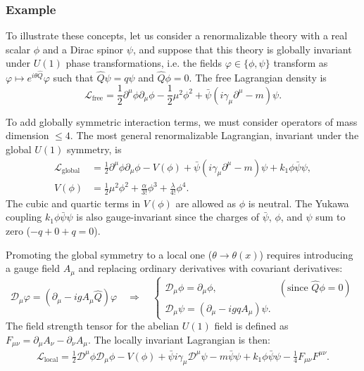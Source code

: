 \subsubsection{Example}
To illustrate these concepts, let us consider a renormalizable theory with a real scalar $\phi$ and a Dirac spinor $\psi$, and suppose that this theory is globally invariant under $U(1)$ phase transformations, i.e. the fields $\varphi\in\{\phi,\psi\}$ transform as $\varphi\mapsto e^{i\theta \hat Q}\varphi $ such that $\hat Q \psi = q \psi$ and $\hat Q \phi=0$. The free Lagrangian density is
\begin{equation}
	\mathcal L_{\text{free}}=\frac{1}{2} \partial^{\mu} \phi \partial_{\mu} \phi-\frac{1}{2}\mu^2\phi^2+\bar{\psi}(i \gamma_\mu  \partial^\mu-m) \psi.
\end{equation}

To add globally symmetric interaction terms, we must consider operators of mass dimension $\leq 4$. The most general renormalizable Lagrangian, invariant under the global $U(1)$ symmetry, is
\begin{equation}
	\begin{aligned}
		\mathcal L_{\text{global}}&=\frac{1}{2} \partial^{\mu} \phi \partial_{\mu} \phi-V(\phi)+\bar{\psi}(i \gamma_\mu  \partial^\mu-m) \psi + k_1 \phi\bar\psi\psi,
		\\
		V(\phi)&=\frac{1}{2}\mu^2\phi^2 +\frac{\alpha}{3!}\phi^3+\frac{\lambda}{4!}\phi^4.
	\end{aligned}
\end{equation}
The cubic and quartic terms in $V(\phi)$ are allowed as $\phi$ is neutral. The Yukawa coupling $k_1 \phi\bar\psi\psi$ is also gauge-invariant since the charges of $\bar\psi$, $\phi$, and $\psi$ sum to zero ($-q + 0 + q = 0$).

Promoting the global symmetry to a local one ($\theta \to \theta(x)$) requires introducing a gauge field $A_\mu$ and replacing ordinary derivatives with covariant derivatives:
\begin{equation}
	\mathcal D_\mu\varphi=(\partial_{\mu}-i g A_\mu\hat Q )\varphi
	\quad\Longrightarrow\quad
	\begin{cases}
		\mathcal D_\mu\phi=\partial_\mu \phi, & (\text{since } \hat Q\phi=0)\\
		\mathcal D_\mu\psi=(\partial_\mu - i g q A_\mu) \psi.
	\end{cases}
\end{equation}
The field strength tensor for the abelian $U(1)$ field is defined as $F_{\mu\nu} = \partial_\mu A_\nu - \partial_\nu A_\mu$. The locally invariant Lagrangian is then:
\begin{multline}
	\mathcal L_{\text{local}}=\frac{1}{2} \mathcal D^{\mu} \phi \mathcal D_{\mu} \phi-V(\phi)
	+\bar{\psi}i \gamma_\mu  \mathcal D^{\mu} \psi - m \bar{\psi}\psi
	+ k_1 \phi\bar\psi\psi-\frac{1}{4} F_{\mu\nu}F^{\mu\nu}.
\end{multline}


